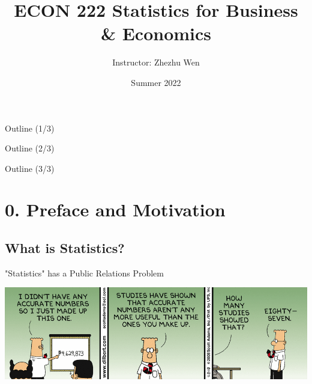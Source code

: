 \documentclass{beamer}
\title[LaTeX Workshop]{ECON 222 Statistics for Business \& Economics}
\author{Instructor: \linebreak Zhezhu Wen}
\institute{Winona State University, MN}
\date{Summer 2022}
\begin{document}
\begin{frame}
  \titlepage
\end{frame}




\begin{frame}{Outline (1/3)}

\begin{small}
\begin{multicols}{2}
  \tableofcontents[sections={1-3}]

\end{multicols}
\end{small}

\end{frame}


\begin{frame}{Outline (2/3)}

\begin{small}
\begin{multicols}{2}
  \tableofcontents[sections={4-5}]

\end{multicols}
\end{small}


\end{frame}


\begin{frame}{Outline (3/3)}

\begin{small}
\begin{multicols}{2}
  \tableofcontents[sections={6}]

\end{multicols}
\end{small}


\end{frame}



\section{0. Preface and Motivation}
\subsection{What is Statistics?} 


\begin{frame}{"Statistics" has a Public Relations Problem}

\begin{center}
\includegraphics[scale=0.48]{dilbertStatistics.png}
\end{center}


\end{frame}
\end{document}
